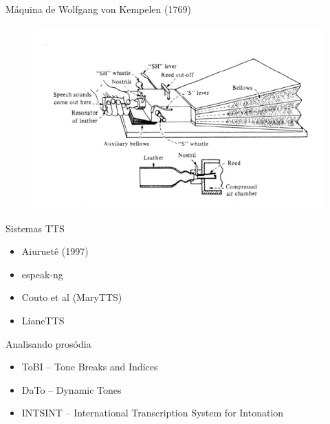 \documentclass{beamer}
\begin{document}
\begin{frame}{Máquina de Wolfgang von Kempelen (1769)}
    \begin{figure}
      \includegraphics[scale=0.40]{kempelen.png}
    \end{figure}
\end{frame}

\begin{frame}{Sistemas TTS}
  \begin{itemize}
      \item Aiuruetê (1997)
      \item espeak-ng 
      \item Couto et al (MaryTTS)
      \item LianeTTS
  \end{itemize}
\end{frame}

\begin{frame}{Analisando prosódia}
  \begin{itemize}
  \item ToBI -- Tone Breaks and Indices
  \item DaTo -- Dynamic Tones
  \item INTSINT -- International Transcription System for Intonation
  \end{itemize}
\end{frame}
\end{document}
